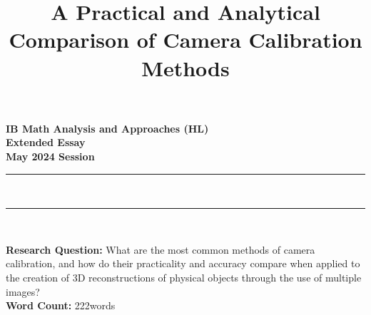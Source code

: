 \documentclass[letter, 12pt, oneside]{article}
\title{A Practical and Analytical Comparison of Camera Calibration Methods}
\providecommand{\wordcount}{222}
\begin{document}
\pagestyle{normal}

\begin{titlepage}
    \large

    \begin{center}

        \vspace*{2cm}

        {\bfseries
            IB Math Analysis and Approaches (HL) \\
            Extended Essay\\
            May 2024 Session}\\

        \vspace*{\fill}

        \rule{\linewidth}{1.5pt} \\ [0.5cm]
        {\LARGE \bfseries \thetitle}
        \rule{\linewidth}{0.5pt} \\

        \vspace*{\fill}

        \textbf{Research Question:} What are the most common methods of camera calibration,  and how do their practicality and accuracy compare when applied to the creation of 3D reconstructions of physical objects through the use of multiple images? \\ [1cm]

        \textbf{Word Count:} \wordcount \space words

        \vspace*{2cm}

    \end{center}

\end{titlepage}

\thispagestyle{empty}
\tableofcontents

\clearpage
{}
\setcounter{page}{1}






\clearpage
\printbibliography[heading=bibintoc]{}
\end{document}
